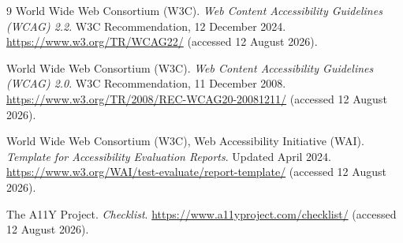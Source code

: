 \documentclass[11pt,a4paper]{article}
\begin{document}
\clearpage
\begin{thebibliography}{9}
    World Wide Web Consortium (W3C).
    \newblock \textit{Web Content Accessibility Guidelines (WCAG) 2.2}.
    \newblock W3C Recommendation, 12 December 2024.
    \newblock \url{https://www.w3.org/TR/WCAG22/}
    (accessed 12 August 2026).

    World Wide Web Consortium (W3C).
    \newblock \textit{Web Content Accessibility Guidelines (WCAG) 2.0}.
    \newblock W3C Recommendation, 11 December 2008.
    \newblock \url{https://www.w3.org/TR/2008/REC-WCAG20-20081211/}
    (accessed 12 August 2026).

    World Wide Web Consortium (W3C), Web Accessibility Initiative (WAI).
    \newblock \textit{Template for Accessibility Evaluation Reports}.
    \newblock Updated April 2024.
    \newblock \url{https://www.w3.org/WAI/test-evaluate/report-template/}
    (accessed 12 August 2026).

    The A11Y Project.
    \newblock \textit{Checklist}.
    \newblock \url{https://www.a11yproject.com/checklist/}
    (accessed 12 August 2026).
\end{thebibliography}
\end{document}
